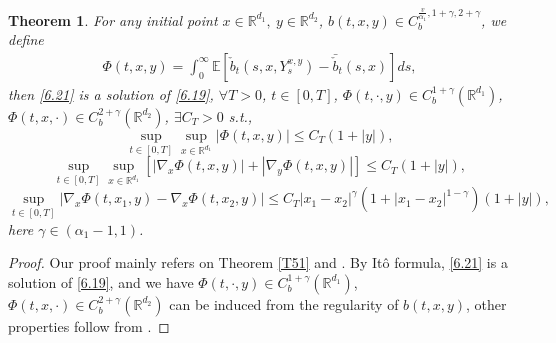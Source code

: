 \documentclass[11pt,reqno]{amsart}
\newtheorem{theorem}{\indent Theorem}[section]
\numberwithin{equation}{section}
\begin{document}
\begin{theorem}\label{T61}
	For any  initial point $x\in\mathbb{R}^{d_{1}},\ y\in\mathbb{R}^{d_{2}}$, $ b(t,x,y)\in C_{b}^{\frac{v}{\alpha_{1}},1+\gamma,2+\gamma}$, we define 
	\begin{equation}\label{6.21}
		\begin{split}
			\Phi(t,x,y)=\int^{\infty}_{0}\mathbb{E}\left[ \check{b}_{t}(s,x,Y_{s}^{x,y})-\bar{\check{b}}_{t}(s,x)\right]ds,
		\end{split}
	\end{equation}
	then \eqref{6.21} is a solution of \eqref{6.19},  $\forall T>0$, $t\in [0,T]$,  $	\Phi(t,\cdot,y)\in C^{1+\gamma}_{b}(\mathbb{R}^{d_{1}})$, $	\Phi(t,x,\cdot)\in C_{b}^{2+\gamma}(\mathbb{R}^{ d_{2}})$,  $\exists C_{T}>0$ s.t.,
	\begin{equation}\label{6.23}
		\sup_{t\in [0,T]} \sup_{x\in \mathbb{R}^{d_{1}}}	 |\Phi(t,x,y)| \leq C_{T}(1+|y|),
	\end{equation}
	\begin{equation}\label{6.24}
		\sup_{t\in [0,T]} 	\sup_{x\in \mathbb{R}^{d_{1}}}[|\nabla_{x}\Phi(t,x,y)|+|\nabla_{y}\Phi(t,x,y)|]\leq C_{T}(1+|y|),
	\end{equation}
	\begin{equation}\label{6.25}
		\sup_{t\in [0,T]} |\nabla_{x}\Phi(t,x_{1},y)-\nabla_{x}\Phi(t,x_{2},y)|\leq C_{T}|x_{1}-x_{2}|^{\gamma}(1+|x_{1}-x_{2}|^{1-\gamma})(1+|y|),
	\end{equation}
		here $\gamma\in (\alpha_{1}-1,1)$.
\end{theorem}
\begin{proof}
	Our proof mainly refers on Theorem \ref{T51} and \cite[Proposition 3.3]{SXX} . By It\^{o} formula, \eqref{6.21} is a solution of \eqref{6.19}, and we have  $	\Phi(t,\cdot,y)\in C^{1+\gamma}_{b}(\mathbb{R}^{d_{1}})$, $	\Phi(t,x,\cdot)\in C_{b}^{2+\gamma}(\mathbb{R}^{ d_{2}})$ can be induced from the regularity of $b(t,x,y)$, other properties follow from \cite{SXX}.
\end{proof}
\end{document}
